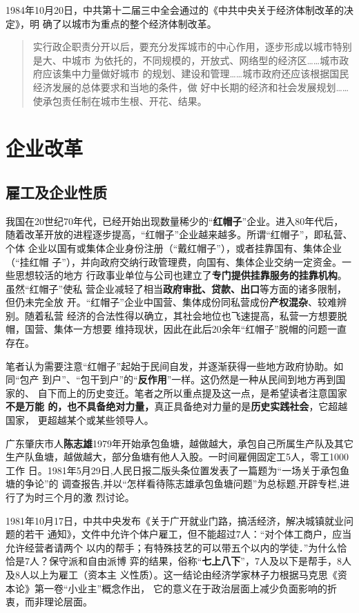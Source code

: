 1984年10月20日，中共第十二届三中全会通过的《中共中央关于经济体制改革的决定》，明
确了以城市为重点的整个经济体制改革。
\begin{quotation}
  实行政企职责分开以后，要充分发挥城市的中心作用，逐步形成以城市特别是大、中城市
  为依托的，不同规模的，开放式、网络型的经济区……城市政府应该集中力量做好城市
  的规划、建设和管理……城市政府还应该根据国民经济发展的总体要求和当地的条件，做
  好中长期的经济和社会发展规划……使承包责任制在城市生根、开花、结果。
\end{quotation}

\section{企业改革}

\subsection{雇工及企业性质}

我国在20世纪70年代，已经开始出现数量稀少的“\textbf{红帽子}”企业。进入80年代后，
随着改革开放的进程逐步提高，“红帽子”企业越来越多。所谓“红帽子”，即私营、个体
企业以国有或集体企业身份注册（“戴红帽子”），或者挂靠国有、集体企业（“挂红帽
子”），并向政府交纳行政管理费，向国有、集体企业交纳一定资金。一些思想较活的地方
行政事业单位与公司也建立了\textbf{专门提供挂靠服务的挂靠机构}。虽然“红帽子”使私
营企业减轻了相当\textbf{政府审批、贷款、出口}等方面的诸多限制，但仍未完全放
开。“红帽子”企业中国营、集体成份同私营成份\textbf{产权混杂}、较难辨别。随着私营
经济的合法性得以确立，其社会地位也飞速提高，私营一方想要脱帽，国营、集体一方想要
维持现状，因此在此后20余年“红帽子”脱帽的问题一直存在。

笔者认为需要注意“红帽子”起始于民间自发，并逐渐获得一些地方政府协助。如同“包产
到户”、“包干到户”的“\textbf{反作用}”一样。这仍然是一种从民间到地方再到国家的、
自下而上的历史变迁。笔者之所以重点提及这一点，是希望读者注意国家\textbf{不是万能
  的，也不具备绝对力量，}真正具备绝对力量的是\textbf{历史实践社会}，它超越国家，
更超越某个或某些领导人。

广东肇庆市人\textbf{陈志雄}1979年开始承包鱼塘，越做越大，承包自己所属生产队及其它
生产队鱼塘，越做越大，部分鱼塘有他人入股。一时间雇佣固定工5人，零工1000工作
日。1981年5月29日,人民日报二版头条位置发表了一篇题为“一场关于承包鱼塘的争论”的
调查报告,并以“怎样看待陈志雄承包鱼塘问题”为总标题,开辟专栏,进行了为时三个月的激
烈讨论。

1981年10月17日，中共中央发布《关于广开就业门路，搞活经济，解决城镇就业问题的若干
通知》，文件中允许个体户雇工，但不能超过7人：“对个体工商户，应当允许经营者请两个
以内的帮手；有特殊技艺的可以带五个以内的学徒．”为什么恰恰是7人？保守派和自由派博
弈的结果，俗称“\textbf{七上八下}”，7人及以下是帮手，8人及8人以上为雇工（资本主
义性质）。这一结论由经济学家林子力根据马克思《资本论》第一卷“小业主”概念作出，
它的意义在于政治层面上减少负面影响的折衷，而非理论层面。

